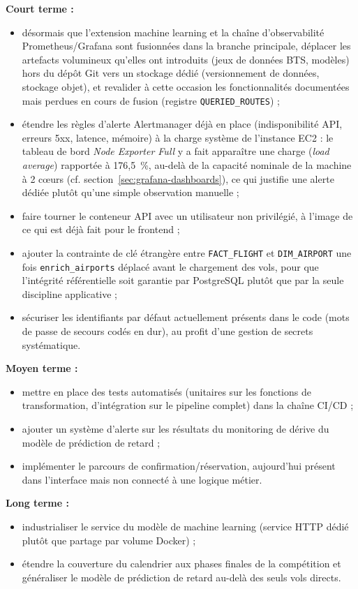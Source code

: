 \documentclass[11pt,a4paper]{report}
\newcommand{\code}[1]{\lstinline{#1}}
\begin{document}
\textbf{Court terme :}
\begin{itemize}
  \item désormais que l'extension machine learning et la chaîne d'observabilité Prometheus/Grafana sont fusionnées dans la branche principale, déplacer les artefacts volumineux qu'elles ont introduits (jeux de données BTS, modèles) hors du dépôt Git vers un stockage dédié (versionnement de données, stockage objet), et revalider à cette occasion les fonctionnalités documentées mais perdues en cours de fusion (registre \code{QUERIED_ROUTES}) ;
  \item étendre les règles d'alerte Alertmanager déjà en place (indisponibilité API, erreurs 5xx, latence, mémoire) à la charge système de l'instance EC2 : le tableau de bord \emph{Node Exporter Full} y a fait apparaître une charge (\emph{load average}) rapportée à 176,5~\%, au-delà de la capacité nominale de la machine à 2 cœurs (cf. section~\ref{sec:grafana-dashboards}), ce qui justifie une alerte dédiée plutôt qu'une simple observation manuelle ;
  \item faire tourner le conteneur API avec un utilisateur non privilégié, à l'image de ce qui est déjà fait pour le frontend ;
  \item ajouter la contrainte de clé étrangère entre \code{FACT_FLIGHT} et \code{DIM_AIRPORT} une fois \code{enrich_airports} déplacé avant le chargement des vols, pour que l'intégrité référentielle soit garantie par PostgreSQL plutôt que par la seule discipline applicative ;
  \item sécuriser les identifiants par défaut actuellement présents dans le code (mots de passe de secours codés en dur), au profit d'une gestion de secrets systématique.
\end{itemize}

\textbf{Moyen terme :}
\begin{itemize}
  \item mettre en place des tests automatisés (unitaires sur les fonctions de transformation, d'intégration sur le pipeline complet) dans la chaîne CI/CD ;
  \item ajouter un système d'alerte sur les résultats du monitoring de dérive du modèle de prédiction de retard ;
  \item implémenter le parcours de confirmation/réservation, aujourd'hui présent dans l'interface mais non connecté à une logique métier.
\end{itemize}

\textbf{Long terme :}
\begin{itemize}
  \item industrialiser le service du modèle de machine learning (service HTTP dédié plutôt que partage par volume Docker) ;
  \item étendre la couverture du calendrier aux phases finales de la compétition et généraliser le modèle de prédiction de retard au-delà des seuls vols directs.
\end{itemize}
\end{document}
